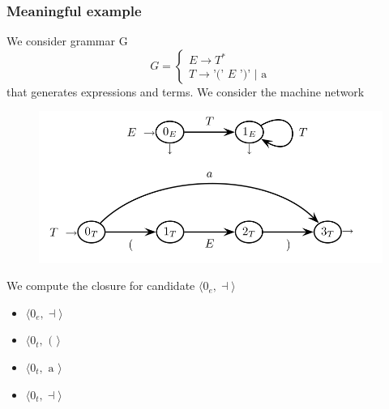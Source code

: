 \documentclass[10pt,a4paper]{article}
\begin{document}
				\subsubsection{Meaningful example}
					We consider grammar G
					\begin{equation}
						G = 
						\begin{cases}
							E \rightarrow T^\ast\\
							T \rightarrow \text{'(' } E \text{ ')' } \vert \text{ a}
						\end{cases}
					\end{equation}
					that generates expressions and terms. We consider the machine network
					\begin{figure}[H]
						\begin{center}
							\includegraphics[width = \textwidth]{./images/exNetwork.png}
						\end{center}
					\end{figure}
					We compute the closure for candidate $\langle 0_e, \dashv \rangle$
					\begin{itemize}
						\item $\langle 0_e, \dashv \rangle$
						\item $\langle 0_t, \text{ ( }\rangle$
						\item $\langle 0_t, \text{ a }\rangle$
						\item $\langle 0_t, \dashv \rangle$
					\end{itemize}
			
\end{document}
